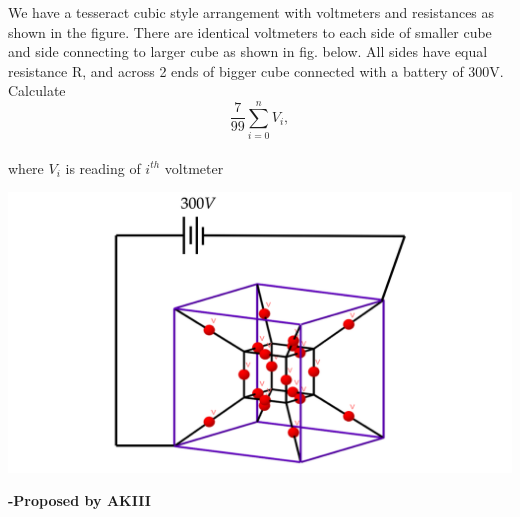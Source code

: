 \documentclass[11pt,a4paper]{scrartcl}
\begin{document}
\begin{problem}

We have a tesseract cubic style arrangement with voltmeters and resistances as shown in the figure. There are identical voltmeters to each side of smaller cube and side connecting to larger cube as shown in fig. below. All sides have equal resistance R, and across 2 ends of bigger cube connected with a battery of 300V. Calculate
$$\frac{7}{99}\sum_{i = 0}^{n} V_i,$$\\ where $V_i$ is reading of $i^{th}$ voltmeter

\begin{center}
    \includegraphics[width=\textwidth]{unknown.png}
\end{center}
\end{problem}
\begin{flushright}
\textbf{\Large{-Proposed by AKIII}}
\end{flushright}
\end{document}
